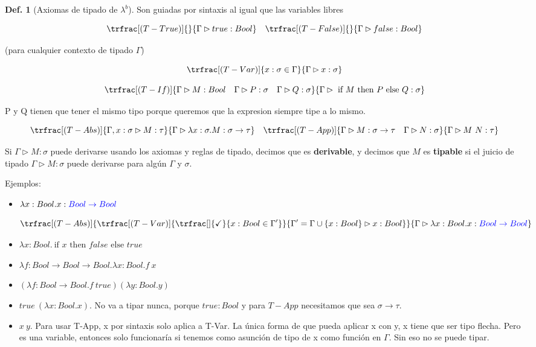 \documentclass{report}
\theoremstyle{definition} %
\newtheorem{definition}{Def.}[chapter]
\newcommand{\lambdab}{\lambda^b}
\newcommand{\tfunc}[2]{#1 \to #2}
\newcommand{\ifte}[3]{\ \text{if } #1 \text{ then } #2 \text{ else } #3}
\newcommand{\abs}[3]{\lambda #1 : #2 . #3}
\newcommand{\app}[2]{#1 \ #2} %
\newcommand{\tipa}[3]{#1 \rhd #2 : #3} %
\newcommand{\tienetipo}[3]{#1 : #2 \in #3}
\newcommand{\Gtipa}[2]{\tipa{\Gamma}{#1}{#2}}
\newcommand{\deriv}[3]{\trfrac[(#1)]{#2}{#3}}
\newcommand{\derivok}[1]{\trfrac[]{\checkmark}{#1}}
\begin{document}
\begin{definition}[Axiomas de tipado de $\lambdab$]

Son guiadas por sintaxis al igual que las variables libres

\[
    \deriv{T-True}{}{\Gtipa{true}{Bool}} \quad
    \deriv{T-False}{}{\Gtipa{false}{Bool}}
\]

(para cualquier contexto de tipado $\Gamma$)

\[
    \deriv
        {T-Var}
        {\tienetipo{x}{\sigma}{\Gamma}}
        {\Gtipa{x}{\sigma}}
\]

\[
    \deriv
        {T-If}
        {
            \Gtipa{M}{Bool} \quad
            \Gtipa{P}{\sigma} \quad
            \Gtipa{Q}{\sigma}
        }
        {\Gtipa{\ifte{M}{P}{Q}}{\sigma}}
\]

P y Q tienen que tener el mismo tipo porque queremos que la expresion siempre
tipe a lo mismo.

\[
    \deriv
        {T-Abs}
        {\tipa{\Gamma, x : \sigma}{M}{\tau}}
        {\Gtipa{\abs{x}{\sigma}{M}}{\tfunc{\sigma}{\tau}}}
    \quad
    \deriv
        {T-App}
        {
            \Gtipa{M}{\tfunc{\sigma}{\tau}} \quad
            \Gtipa{N}{\sigma}
        }
        {\Gtipa{\app{M}{N}}{\tau}}
\]
\end{definition}

Si $\Gtipa{M}{\sigma}$ puede derivarse usando los axiomas y reglas de tipado,
decimos que es \textbf{derivable}, y decimos que $M$ es \textbf{tipable} si el
juicio de tipado $\Gtipa{M}{\sigma}$ puede derivarse para algún $\Gamma$ y
$\sigma$.

Ejemplos:

\begin{itemize}
    \item $\abs{x}{Bool}{x} : \textcolor{blue}{\tfunc{Bool}{Bool}}$
    
    \[
    \deriv
        {T-Abs}
        {
            \deriv
                {T-Var}
                {\derivok{x : Bool \in \Gamma'}}
                {
                    \tipa{\Gamma' = \Gamma \cup \{x : Bool\}}{x}{Bool}
                }
        }
        {\Gtipa{\abs{x}{Bool}{x}}{\textcolor{blue}{\tfunc{Bool}{Bool}}}}
    \]

    \item $\abs{x}{Bool}{\ifte{x}{false}{true}}$
    \item $\abs{f}{\tfunc{Bool}{\tfunc{Bool}{Bool}}}{\abs{x}{Bool}{\app{f}{x}}}$
    \item $(\abs{f}{\tfunc{Bool}{Bool}} \app{f}{true})(\abs{y}{Bool}{y})$
    \item $\app{true}{(\abs{x}{Bool}{x})}$. No va a tipar nunca, porque $true :
    Bool$ y para $T-App$ necesitamos que sea $\tfunc{\sigma}{\tau}$.
    \item $\app{x}{y}$. Para usar T-App, x por sintaxis solo aplica a T-Var. La
    única forma de que pueda aplicar x con y, x tiene que ser tipo flecha. Pero
    es una variable, entonces solo funcionaría si tenemos como asunción de tipo
    de x como función en $\Gamma$. Sin eso no se puede tipar.
\end{itemize}
\end{document}
